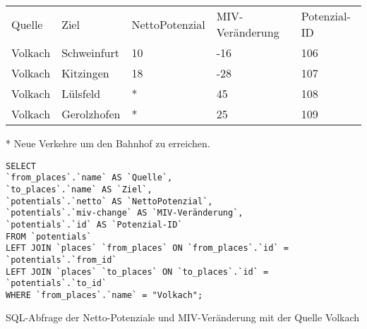 \begin{tabularx}{\textwidth}{*5{X}}
Quelle & Ziel & NettoPotenzial & MIV-Veränderung & Potenzial-ID\\ 
Volkach & Schweinfurt & 10 & -16 & 106\\ 
Volkach & Kitzingen & 18 & -28 & 107\\ 
Volkach & Lülsfeld & * & 45 & 108\\ 
Volkach & Gerolzhofen & * & 25 & 109\\ 
\end{tabularx}
\newline
\newline
* Neue Verkehre um den Bahnhof zu erreichen.
\newline
\begin{listing}[htbp]
\begin{verbatim}
SELECT
`from_places`.`name` AS `Quelle`, 
`to_places`.`name` AS `Ziel`, 
`potentials`.`netto` AS `NettoPotenzial`, 
`potentials`.`miv-change` AS `MIV-Veränderung`, 
`potentials`.`id` AS `Potenzial-ID`
FROM `potentials`
LEFT JOIN `places` `from_places` ON `from_places`.`id` = `potentials`.`from_id`
LEFT JOIN `places` `to_places` ON `to_places`.`id` = `potentials`.`to_id`
WHERE `from_places`.`name` = "Volkach";
\end{verbatim}
\caption{SQL-Abfrage der Netto-Potenziale und MIV-Veränderung mit der Quelle Volkach}\label{lst-fz-volkach}
\end{listing}